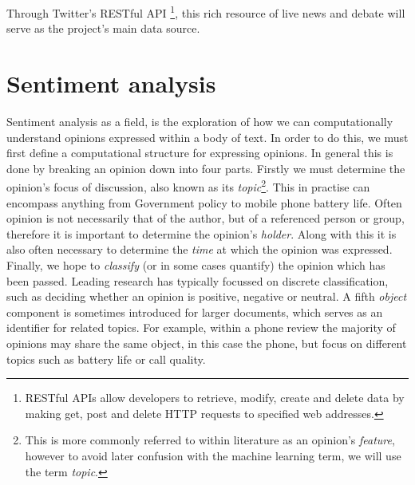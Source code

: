 Through Twitter's RESTful API \footnote{RESTful APIs allow developers to retrieve, modify, create and delete data by making get, post and delete HTTP requests to specified web addresses.}, this rich resource of live news and debate will serve as the project's main data source.

\section{Sentiment analysis}
\label{background:sentiment_analysis}

Sentiment analysis as a field, is the exploration of how we can computationally understand opinions expressed within a body of text. In order to do this, we must first define a computational structure for expressing opinions. In general \cite{Liu:2010tm} this is done by breaking an opinion down into four parts. Firstly we must determine the opinion's focus of discussion, also known as its \emph{topic}\footnote{This is more commonly referred to within literature as an opinion's \emph{feature}, however to avoid later confusion with the machine learning term, we will use the term \emph{topic}.}. This in practise can encompass anything from Government policy to mobile phone battery life. Often opinion is not necessarily that of the author, but of a referenced person or group, therefore it is important to determine the opinion's \emph{holder}. Along with this it is also often necessary to determine the \emph{time} at which the opinion was expressed. Finally, we hope to \emph{classify} (or in some cases quantify) the opinion which has been passed. Leading research \cite{Pang:2002tu,Turney:2002vv} has typically focussed on discrete classification, such as deciding whether an opinion is positive, negative or neutral. A fifth \emph{object} component is sometimes introduced for larger documents, which serves as an identifier for related topics. For example, within a phone review the majority of opinions may share the same object, in this case the phone, but focus on different topics such as battery life or call quality. 

